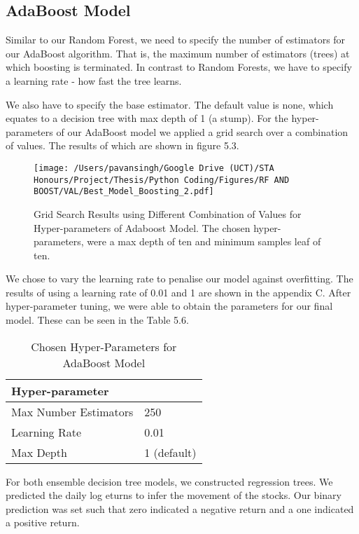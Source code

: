 \subsection{AdaBoost Model}

Similar to our Random Forest, we need to specify the number of estimators for our AdaBoost algorithm. That is, the maximum number of estimators (trees) at which boosting is terminated. In contrast to Random Forests, we have to specify a learning rate - how fast the tree learns. 

We also have to specify the base estimator. The default value is none, which equates to a decision tree with max depth of 1 (a stump). For the hyper-parameters of our AdaBoost model we applied a grid search over a combination of values. The results of which are shown in figure 5.3. 

\begin{figure}[h]
\centering
  \texttt{[image: /Users/pavansingh/Google Drive (UCT)/STA Honours/Project/Thesis/Python Coding/Figures/RF AND BOOST/VAL/Best\_Model\_Boosting\_2.pdf]}
  \caption{Grid Search Results using Different Combination of Values for Hyper-parameters of Adaboost Model. The chosen hyper-parameters, were a max depth of ten and minimum samples leaf of ten.}
  \label{}
\end{figure}

We chose to vary the learning rate to penalise our model against overfitting. The results of using a learning rate of 0.01 and 1 are shown in the appendix C. After hyper-parameter tuning, we were able to obtain the parameters for our final model. These can be seen in the Table 5.6.

\begin{table}[h]
\centering
\begin{tabular}{ll}
\hline
Hyper-parameter     &  \\
\hline
Max Number Estimators       & 250  \\
Learning Rate        & 0.01 \\
Max Depth & 1 (default) \\
\hline
\end{tabular}
\caption{Chosen Hyper-Parameters for AdaBoost Model}
\end{table}

For both ensemble decision tree models, we constructed regression trees. We predicted the daily log eturns to infer the movement of the stocks. Our binary prediction was set such that zero indicated a negative return and a one indicated a positive return.


